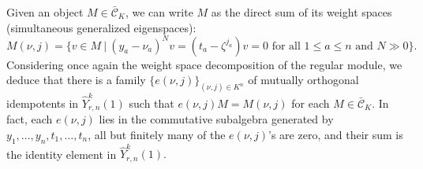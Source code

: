 \documentclass[11pt, reqno]{amsart} \textwidth=14.9cm \oddsidemargin=1cm \evensidemargin=1cm
\theoremstyle{definition}
\numberwithin{equation}{section}
\begin{document}
Given an object $M\in \bar{\mathcal{C}}_{K}$, we can write $M$ as the direct sum of its weight spaces (simultaneous generalized eigenspaces):
\begin{equation}
M(\nu, j)=\{v\in M\:|\:(y_{a}-\nu_{a})^{N}v=(t_{a}-\zeta^{j_{a}})v=0\text{ for all }1\leq a\leq n\text{ and }N\gg 0\}.\label{M-J}
\end{equation}
Considering once again the weight space decomposition of the regular module, we deduce that there is a family $\{e(\nu,j)\}_{(\nu,j)\in K^{n}}$ of mutually orthogonal idempotents in $\widehat{Y}_{r,n}^{k}(1)$ such that $e(\nu,j)M=M(\nu, j)$ for each $M\in \bar{\mathcal{C}}_{K}$. In fact, each $e(\nu, j)$ lies in the commutative subalgebra generated by $y_{1},\ldots, y_{n}, t_{1},\ldots,t_{n}$, all but finitely many of the $e(\nu, j)$'s are zero, and their sum is the identity element in $\widehat{Y}_{r,n}^{k}(1).$
\end{document}
